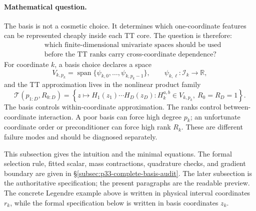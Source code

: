 \documentclass[11pt]{article}
\numberwithin{equation}{section}
\newcommand{\R}{\mathbb R}
\begin{document}
\paragraph{Mathematical question.}
The basis is not a cosmetic choice.  It determines which one-coordinate
features can be represented cheaply inside each TT core.  The question is
therefore:
\begin{equation}
    \begin{aligned}
    &\text{which finite-dimensional univariate spaces should be used}\\
    &\text{before the TT ranks carry cross-coordinate dependence?}
    \end{aligned}
    \label{eq:p30-basis-q}
\end{equation}
For coordinate \(k\), a basis choice declares a space
\begin{equation}
    V_{k,p_k}
    =
    \operatorname{span}\{\psi_{k,0},\ldots,\psi_{k,p_k-1}\},
    \qquad
    \psi_{k,\ell}:\mathcal I_k\to\R,
    \label{eq:p30-basis-space}
\end{equation}
and the TT approximation lives in the nonlinear product family
\begin{equation}
    \mathcal T(p_{1:D},R_{0:D})
    =
    \left\{
    z\mapsto H_1(z_1)\cdots H_D(z_D):
    H_k^{a,b}\in V_{k,p_k},\
    R_0=R_D=1
    \right\}.
    \label{eq:p30-basis-tt-family}
\end{equation}
The basis controls within-coordinate approximation.  The ranks control
between-coordinate interaction.  A poor basis can force high degree \(p_k\);
an unfortunate coordinate order or preconditioner can force high rank \(R_k\).
These are different failure modes and should be diagnosed separately.

This subsection gives the intuition and the minimal equations.  The formal
selection rule, fitted scalar, mass contractions, quadrature checks, and
gradient boundary are given in
\S\ref{subsec:p33-complete-basis-audit}.  The later subsection is the
authoritative specification; the present paragraphs are the readable preview.
The concrete Legendre example above is written in physical interval
coordinates \(r_k\), while the formal specification below is written in basis
coordinates \(z_k\).
\end{document}
